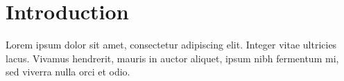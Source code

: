 \chapter{Introduction}
Lorem ipsum dolor sit amet, consectetur adipiscing elit. Integer vitae
ultricies lacus. Vivamus hendrerit, mauris in auctor aliquet, ipsum nibh
fermentum mi, sed viverra nulla orci et odio.
